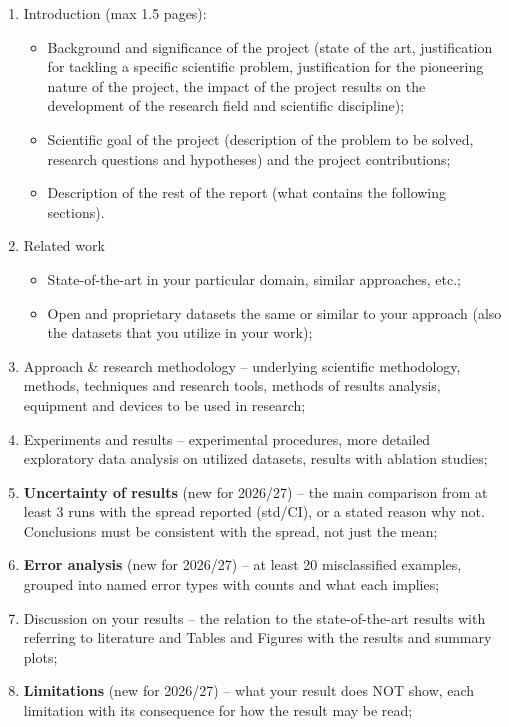 \documentclass[11pt]{article}
\begin{document}
\begin{enumerate}
\item Introduction (max 1.5 pages):
\begin{itemize}
\item Background and significance of the project (state of the art, justification for tackling a specific scientific problem, justification for the pioneering nature of the project, the impact of the project results on the development of the research field and scientific discipline);
\item Scientific goal of the project (description of the problem to be solved, research questions and hypotheses) and the project contributions;
\item Description of the rest of the report (what contains the following sections).
\end{itemize}
\item Related work
\begin{itemize}
\item State-of-the-art in your particular domain, similar approaches, etc.;
\item Open and proprietary datasets the same or similar to your approach (also the datasets that you utilize in your work);
\end{itemize}
\item Approach \& research methodology -- underlying scientific methodology, methods, techniques and research tools, methods of results analysis, equipment and devices to be used in research;
\item Experiments and results -- experimental procedures, more detailed exploratory data analysis on utilized datasets, results with ablation studies;
\item \textbf{Uncertainty of results} (new for 2026/27) -- the main comparison from at least 3 runs with the spread reported (std/CI), or a stated reason why not. Conclusions must be consistent with the spread, not just the mean;
\item \textbf{Error analysis} (new for 2026/27) -- at least 20 misclassified examples, grouped into named error types with counts and what each implies;
\item Discussion on your results -- the relation to the state-of-the-art results with referring to literature and Tables and Figures with the results and summary plots;
\item \textbf{Limitations} (new for 2026/27) -- what your result does NOT show, each limitation with its consequence for how the result may be read;

\end{enumerate}
\end{document}

